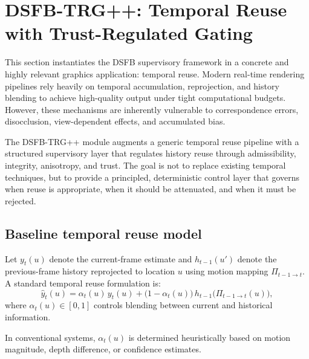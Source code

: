 \documentclass[11pt,letterpaper]{article}
\theoremstyle{gcresult}
\theoremstyle{definition}
\begin{document}

\section{DSFB-TRG++: Temporal Reuse with Trust-Regulated Gating}
\label{sec:trg}

This section instantiates the DSFB supervisory framework in a concrete and highly relevant graphics application: temporal reuse. Modern real-time rendering pipelines rely heavily on temporal accumulation, reprojection, and history blending to achieve high-quality output under tight computational budgets. However, these mechanisms are inherently vulnerable to correspondence errors, disocclusion, view-dependent effects, and accumulated bias.

The DSFB-TRG++ module augments a generic temporal reuse pipeline with a structured supervisory layer that regulates history reuse through admissibility, integrity, anisotropy, and trust. The goal is not to replace existing temporal techniques, but to provide a principled, deterministic control layer that governs when reuse is appropriate, when it should be attenuated, and when it must be rejected.


\subsection{Baseline temporal reuse model}

Let $y_t(u)$ denote the current-frame estimate and $h_{t-1}(u')$ denote the previous-frame history reprojected to location $u$ using motion mapping $\Pi_{t-1\rightarrow t}$. A standard temporal reuse formulation is:
\begin{equation}
\hat{y}_t(u)=\alpha_t(u)\,y_t(u) + \bigl(1-\alpha_t(u)\bigr)\,h_{t-1}\bigl(\Pi_{t-1\rightarrow t}(u)\bigr),
\end{equation}
where $\alpha_t(u)\in[0,1]$ controls blending between current and historical information.

In conventional systems, $\alpha_t(u)$ is determined heuristically based on motion magnitude, depth difference, or confidence estimates.

\end{document}
